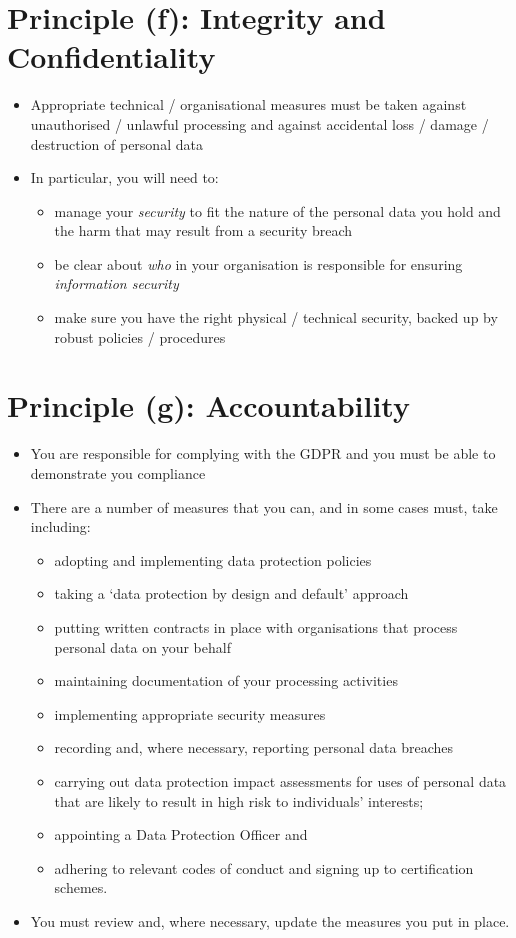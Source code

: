 \documentclass{article}
\begin{document}
\section{Principle (f): Integrity and Confidentiality}
\begin{itemize}
\item Appropriate technical / organisational measures must be taken against unauthorised / unlawful processing and against accidental loss / damage / destruction of personal data
\item In particular, you will need to:
\begin{itemize}
\item manage your {\em security} to fit the nature of the personal data you hold and the harm that may result from a security breach
\item be clear about {\em who} in your organisation is responsible for ensuring {\em information security}
\item make sure you have the right physical / technical security, backed up by robust policies / procedures
\end{itemize}
\end{itemize}



\section{Principle (g): Accountability}
\begin{itemize}
\item You are responsible for complying with the GDPR and you must be able to demonstrate you compliance
\item There are a number of measures that you can, and in some cases must, take including:
\begin{itemize}
\item adopting and implementing data protection policies
\item taking a `data protection by design and default' approach
\item putting written contracts in place with organisations that process personal data on your behalf
\item maintaining documentation of your processing activities
\item implementing appropriate security measures
\item recording and, where necessary, reporting personal data breaches
\item carrying out data protection impact assessments for uses of personal data that are likely to result in high risk to individuals' interests;
\item appointing a Data Protection Officer and
\item adhering to relevant codes of conduct and signing up to certification schemes.
\end{itemize}
\item You must review and, where necessary, update the measures you put in place.
\end{itemize}
\end{document}
